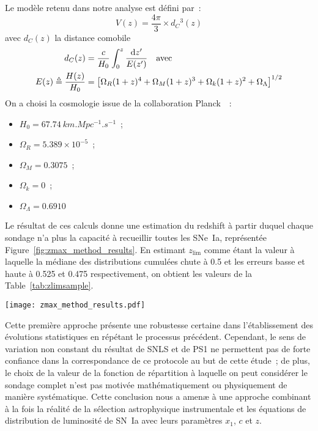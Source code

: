 \documentclass[../main/main.tex]{subfiles}
\begin{document}
Le modèle retenu dans notre analyse est défini par~:
\begin{equation}\label{eq:comobvol}
    V(z) = \frac{4\pi}{3}\times d_C{}^3(z)
\end{equation}
avec $d_C(z)$ la distance comobile
\begin{align}
    d_C(z)                           & =
    \frac{c}{H_0} \int_{0}^{z} \frac{\mathrm{d} z'}{E(z')}
    \quad\text{avec}\quad\\
    E(z) \triangleq \frac{H(z)}{H_0} & =
    \left[\Omega_R(1+z)^4 + \Omega_M(1+z)^3 +
        \Omega_k(1+z)^2 + \Omega_\Lambda
    \right]^{1/2}
\end{align}
On a choisi la cosmologie issue de la collaboration Planck~\citep{planck2018}~:
\begin{itemize}
    \item $H_0 = \SI{67.74}{km.Mpc^{-1}.s^{-1}}$~;
    \item $\Omega_R = 5.389\times10^{-5}$~;
    \item $\Omega_M = 0.3075$~;
    \item $\Omega_k = 0$~;
    \item $\Omega_\Lambda = 0.6910$
\end{itemize}

Le résultat de ces calculs donne une estimation du redshift à partir duquel
chaque sondage n'a plus la capacité à recueillir toutes les SNe~Ia, représentée
Figure~\ref{fig:zmax_method_results}. En estimant $z_{\lim}$ comme étant la
valeur à laquelle la médiane des distributions cumulées chute à 0.5 et les
erreurs basse et haute à 0.525 et 0.475 respectivement, on obtient les valeurs
de la Table~\ref{tab:zlimsample}.

\begin{SCfigure}[0.5]
    \centering
    \texttt{[image: zmax\_method\_results.pdf]}
    \captionsetup{justification=centering}
    \caption{Résultat graphique de l'évolution médiane de l'étude statistique du
    redshift limite pour les sondages SDSS, PS1, et SNLS}
    \label{fig:zmax_method_results}
\end{SCfigure}

Cette première approche présente une robustesse certaine dans l'établissement
des évolutions statistiques en répétant le processus précédent. Cependant, le
sens de variation non constant du résultat de SNLS et de PS1 ne permettent pas
de forte confiance dans la correspondance de ce protocole au but de cette
étude~; de plus, le choix de la valeur de la fonction de répartition à laquelle
on peut considérer le sondage complet n'est pas motivée mathématiquement ou
physiquement de manière systématique. Cette conclusion nous a amenæ à une
approche combinant à la fois la réalité de la sélection astrophysique
instrumentale et les équations de distribution de luminosité de SN~Ia avec leurs
paramètres $x_1$, $c$ et $z$.
\end{document}
